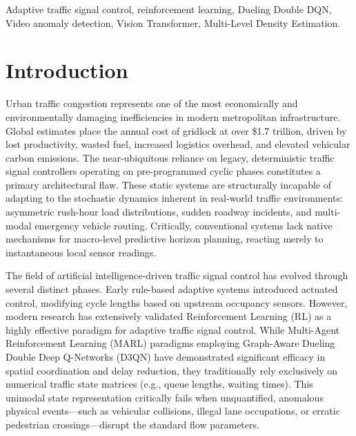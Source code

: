 \documentclass[conference]{IEEEtran}
\begin{document}
\begin{IEEEkeywords}
Adaptive traffic signal control, reinforcement learning, Dueling Double DQN, Video anomaly detection, Vision Transformer, Multi-Level Density Estimation.
\end{IEEEkeywords}

\section{Introduction}
Urban traffic congestion represents one of the most economically and environmentally damaging inefficiencies in modern metropolitan infrastructure. Global estimates place the annual cost of gridlock at over \$1.7 trillion, driven by lost productivity, wasted fuel, increased logistics overhead, and elevated vehicular carbon emissions. The near-ubiquitous reliance on legacy, deterministic traffic signal controllers operating on pre-programmed cyclic phases constitutes a primary architectural flaw. These static systems are structurally incapable of adapting to the stochastic dynamics inherent in real-world traffic environments: asymmetric rush-hour load distributions, sudden roadway incidents, and multi-modal emergency vehicle routing. Critically, conventional systems lack native mechanisms for macro-level predictive horizon planning, reacting merely to instantaneous local sensor readings. 

The field of artificial intelligence-driven traffic signal control has evolved through several distinct phases. Early rule-based adaptive systems introduced actuated control, modifying cycle lengths based on upstream occupancy sensors. However, modern research has extensively validated Reinforcement Learning (RL) as a highly effective paradigm for adaptive traffic signal control. While Multi-Agent Reinforcement Learning (MARL) paradigms employing Graph-Aware Dueling Double Deep Q-Networks (D3QN) have demonstrated significant efficacy in spatial coordination and delay reduction, they traditionally rely exclusively on numerical traffic state matrices (e.g., queue lengths, waiting times). This unimodal state representation critically fails when unquantified, anomalous physical events—such as vehicular collisions, illegal lane occupations, or erratic pedestrian crossings—disrupt the standard flow parameters.
\end{document}
